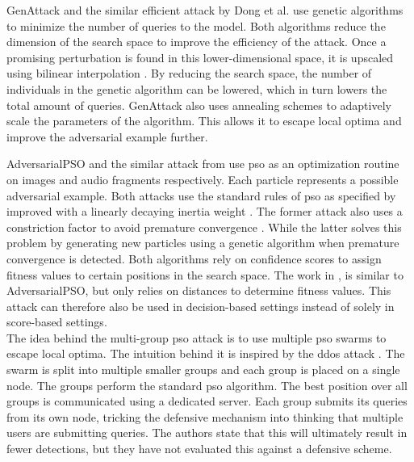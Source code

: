 \begin{minipage}{\textwidth}
GenAttack \cite{genattack} and the similar efficient attack by Dong et al. \cite{dong2019efficient} use genetic algorithms to minimize the number of queries to the model. Both algorithms reduce the dimension of the search space to improve the efficiency of the attack. Once a promising perturbation is found in this lower-dimensional space, it is upscaled using bilinear interpolation \cite{bilinear_interpolation}. By reducing the search space, the number of individuals in the genetic algorithm can be lowered, which in turn lowers the total amount of queries. GenAttack also uses annealing schemes \cite{annealing} to adaptively scale the parameters of the algorithm. This allows it to escape local optima and improve the adversarial example further. \\
\end{minipage}

AdversarialPSO \cite{mosli2019they} and the similar attack from \cite{audio_pso} use \gls{pso} as an optimization routine on images and audio fragments respectively. Each particle represents a possible adversarial example. Both attacks use the standard rules of \gls{pso} as specified by \cite{pso} improved with a linearly decaying inertia weight \cite{inertia_weight}. The former attack also uses a constriction factor to avoid premature convergence \cite{constriction_factor}. While the latter solves this problem by generating new particles using a genetic algorithm when premature convergence is detected. Both algorithms rely on confidence scores to assign fitness values to certain positions in the search space. The work in \cite{distributed_pso_attack}, is similar to AdversarialPSO, but only relies on distances to determine fitness values. This attack can therefore also be used in decision-based settings instead of solely in score-based settings.\\

The idea behind the multi-group \gls{pso} attack \cite{suryanto2020} is to use multiple \gls{pso} swarms to escape local optima. The intuition behind it is inspired by the \gls{ddos} attack \cite{ddos}. The swarm is split into multiple smaller groups and each group is placed on a single node. The groups perform the standard \gls{pso} algorithm. The best position over all groups is communicated using a dedicated server. Each group submits its queries from its own node, tricking the defensive mechanism into thinking that multiple users are submitting queries. The authors state that this will ultimately result in fewer detections, but they have not evaluated this against a defensive scheme.\\
